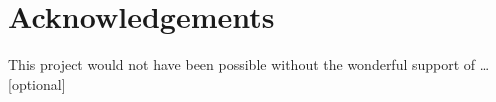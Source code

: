 \documentclass[12pt,a4paper,twoside]{report}
\newif\ifsubmission %
\begin{document}

\ifsubmission\else

\chapter*{Acknowledgements}

This project would not have been possible without the wonderful
support of \ldots [optional]

\fi
\cleardoublepage %

\tableofcontents













\label{lastcontentpage} %




\label{lastpage}
\end{document}
